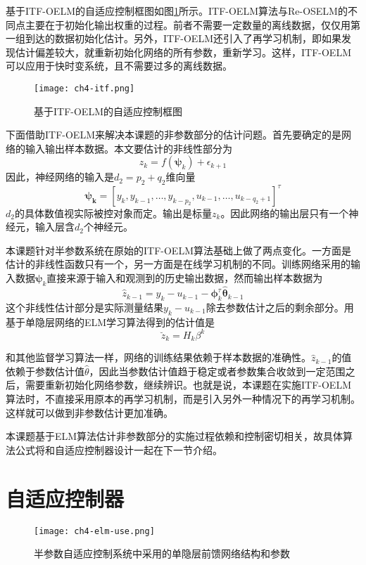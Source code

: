 基于ITF-OELM的自适应控制框图如图\ref{fig.itf-oelm}所示。ITF-OELM算法与Re-OSELM的不同点主要在于初始化输出权重的过程。前者不需要一定数量的离线数据，仅仅用第一组到达的数据初始化估计。另外，ITF-OELM还引入了再学习机制，即如果发现估计偏差较大，就重新初始化网络的所有参数，重新学习。这样，ITF-OELM可以应用于快时变系统，且不需要过多的离线数据。
\begin{figure}[!htb]
  \centering
  \texttt{[image: ch4-itf.png]}\\	 %
  \caption{基于ITF-OELM的自适应控制框图}
  \label{fig.itf-oelm}
\end{figure}

下面借助ITF-OELM来解决本课题的非参数部分的估计问题。首先要确定的是网络的输入输出样本数据。本文要估计的非线性部分为
\begin{equation}
z_{k} = f(\bm{\psi}_{k}) + \epsilon_{k+1}
\end{equation}
因此，神经网络的输入是$d_{2}=p_{2}+q_{2}$维向量
$$\bm{\psi_{k}}=[y_{k},y_{k-1},\ldots,y_{k-p_{2}},u_{k-1},\dots,u_{k-q_{2}+1}]^{\tau}$$
$d_{2}$的具体数值视实际被控对象而定。输出是标量$z_{k}$。因此网络的输出层只有一个神经元，输入层含$d_{2}$个神经元。

本课题针对半参数系统在原始的ITF-OELM算法基础上做了两点变化。一方面是估计的非线性函数只有一个，另一方面是在线学习机制的不同。训练网络采用的输入数据$\bm{\psi}_{k}$直接来源于输入和观测到的历史输出数据，然而输出样本数据为
\begin{equation}\label{eq:4.hatz}
\hat{z}_{k-1}=y_{k}-u_{k-1}-\bm{\phi}_{k}^{\tau}\hat{\bm{\theta}}_{k-1}
\end{equation}
这个非线性估计部分是实际测量结果$y_{k}-u_{k-1}$除去参数估计之后的剩余部分。用基于单隐层网络的ELM学习算法得到的估计值是
\begin{equation}\label{eq:4.z.breave}
\breve{z}_{k}=H_{k}\beta^{k}
\end{equation}

和其他监督学习算法一样，网络的训练结果依赖于样本数据的准确性。$\hat{z}_{k-1}$的值依赖于参数估计值$\hat{\theta}$，因此当参数估计值趋于稳定或者参数集合收敛到一定范围之后，需要重新初始化网络参数，继续辨识。也就是说，本课题在实施ITF-OELM算法时，不直接采用原本的再学习机制，而是引入另外一种情况下的再学习机制。这样就可以做到非参数估计更加准确。

本课题基于ELM算法估计非参数部分的实施过程依赖和控制密切相关，故具体算法公式将和自适应控制器设计一起在下一节介绍。

\section{自适应控制器}\label{sect:4.3}
\begin{figure}[!htb]
  \centering
  \texttt{[image: ch4-elm-use.png]}\\	 %
  \caption{半参数自适应控制系统中采用的单隐层前馈网络结构和参数}
  \label{fig.elm.use}
\end{figure}

